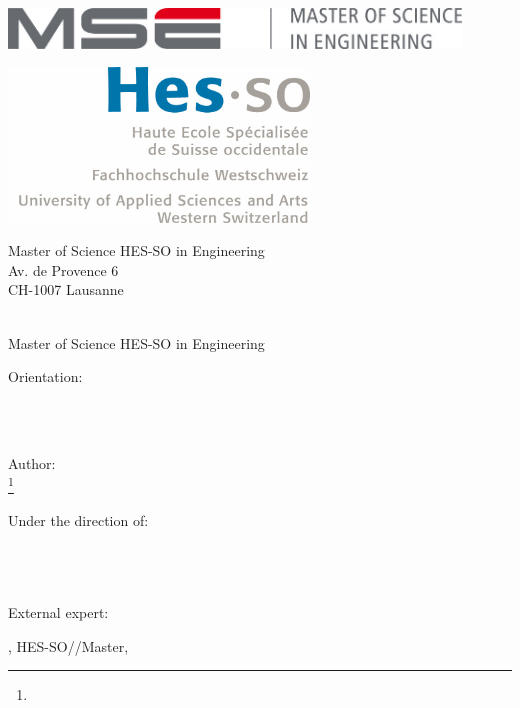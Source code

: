 \begin{titlepage}
{\selectfont
	\begin{flushright}
		\begin{minipage}{0.5\textwidth}
			\begin{flushleft}
				\includegraphics[width=0.9\textwidth]{99-imgs/logo_mse}
			\end{flushleft}
		\end{minipage}%
		\begin{minipage}{0.5\textwidth}
			\begin{flushright}
				\includegraphics[width=0.6\textwidth]{99-imgs/logo_hesso}
			\end{flushright}
		\end{minipage}
		\begin{flushleft}\scriptsize
		Master of Science HES-SO in Engineering \\
		Av. de Provence 6 \\
		CH-1007 Lausanne
		\end{flushleft}
		
		~\\[0.5cm]
		
		{\Huge Master of Science HES-SO in Engineering\\[0.5cm]}
		
		{\LARGE Orientation: \Orientation\\[0.5cm] ~\\[1cm]}
		
		{\Huge \ThesisTitle \\[1.5cm]}
		
		{
		\large Author:\\
		\Huge \Author\footnote{\AuthorEmail} \\[1cm]
		}
		
		{
		\large Under the direction of: \\ 
		\Supervisor \\
		\SupervisorSchool \\
		\SupervisorResearchUnit \\[0.5cm]
		}
		
		{
		\large External expert: \\
		\Expert
		}
		
		\vfill
		
		{\large \Locality, HES-SO//Master, \Date}
		
	\end{flushright}		
}
\end{titlepage}